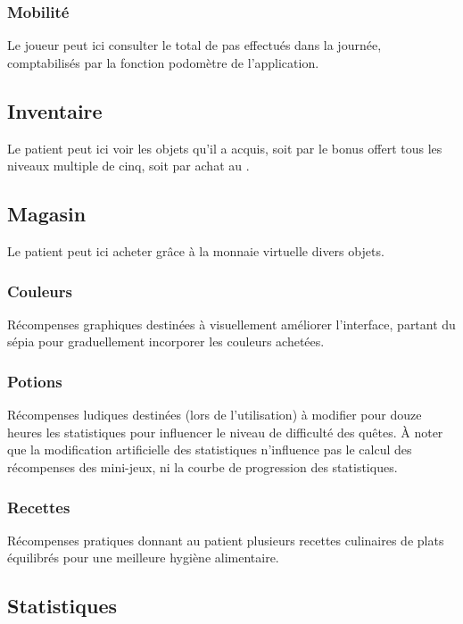 \documentclass[a4paper,12pt,francais]{article}
\begin{document}
\subsubsection{Mobilité}
Le joueur peut ici consulter le total de pas effectués dans la journée, comptabilisés par la fonction podomètre de l'application.

\subsection{Inventaire}\label{subsec:inventaire}
Le patient peut ici voir les objets qu’il a acquis, soit par le bonus offert tous les niveaux multiple de cinq, soit par achat au .

\subsection{Magasin}\label{subsec:magasin}
Le patient peut ici acheter grâce à la monnaie virtuelle divers objets.

\subsubsection{Couleurs}
Récompenses graphiques destinées à visuellement améliorer l'interface, partant du sépia pour graduellement incorporer les couleurs achetées.

\subsubsection{Potions}\label{subsubsec:potions}
Récompenses ludiques destinées (lors de l'utilisation) à modifier pour douze heures les statistiques pour influencer le niveau de difficulté des quêtes. À noter que la modification artificielle des statistiques n'influence pas le calcul des récompenses des mini-jeux, ni la courbe de progression des statistiques.

\subsubsection{Recettes}
Récompenses pratiques donnant au patient plusieurs recettes culinaires de plats équilibrés pour une meilleure hygiène alimentaire. %

\subsection{Statistiques}\label{subsec:stats-detail}
\end{document}
